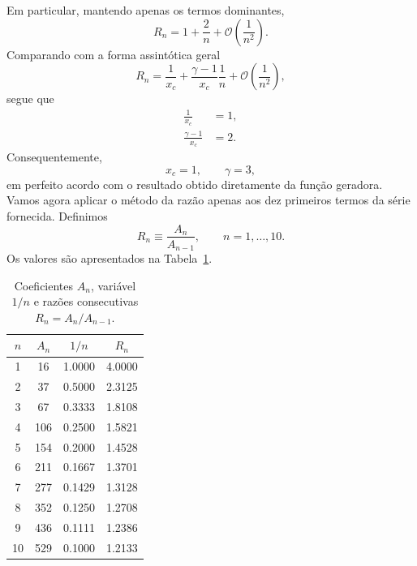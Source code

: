 \documentclass[11pt,a4paper]{article}
\begin{document}
%
Em particular, mantendo apenas os termos dominantes,
%
\begin{equation}
    R_n
    =
    1+\frac{2}{n}
    +
    \mathcal O\left(\frac{1}{n^2}\right).
    \label{eq:R_dominant_p5}
\end{equation}
%
Comparando com a forma assintótica geral
%
\begin{equation}
    R_n
    =
    \frac{1}{x_c}
    +
    \frac{\gamma-1}{x_c}\frac{1}{n}
    +
    \mathcal O\left(\frac{1}{n^2}\right),
\end{equation}
%
segue que
%
\begin{align}
    \frac{1}{x_c}&=1,
    \\
    \frac{\gamma-1}{x_c}&=2.
\end{align}
%
Consequentemente,
%
\begin{equation}
    \boxed{
    x_c=1,
    \qquad
    \gamma=3,
    }
\end{equation}
%
em perfeito acordo com o resultado obtido diretamente da função
geradora. Vamos agora aplicar o método da razão apenas aos dez primeiros termos da série fornecida. Definimos
%
\begin{equation}
    R_n\equiv\frac{A_n}{A_{n-1}},
    \qquad
    n=1,\ldots,10.
\end{equation}
%
Os valores são apresentados na Tabela~\ref{tab:ratio_p5}.
%
\begin{table}[htbp]
    \centering
    \caption{
        Coeficientes $A_n$, variável $1/n$ e razões consecutivas
        $R_n=A_n/A_{n-1}$.
    }
    \label{tab:ratio_p5}
    \begin{tabular}{cccc}
        \toprule
        $n$ & $A_n$ & $1/n$ & $R_n$ \\
        \midrule
        1  & 16  & 1.0000 & 4.0000 \\
        2  & 37  & 0.5000 & 2.3125 \\
        3  & 67  & 0.3333 & 1.8108 \\
        4  & 106 & 0.2500 & 1.5821 \\
        5  & 154 & 0.2000 & 1.4528 \\
        6  & 211 & 0.1667 & 1.3701 \\
        7  & 277 & 0.1429 & 1.3128 \\
        8  & 352 & 0.1250 & 1.2708 \\
        9  & 436 & 0.1111 & 1.2386 \\
        10 & 529 & 0.1000 & 1.2133 \\
        \bottomrule
    \end{tabular}
\end{table}
\end{document}
